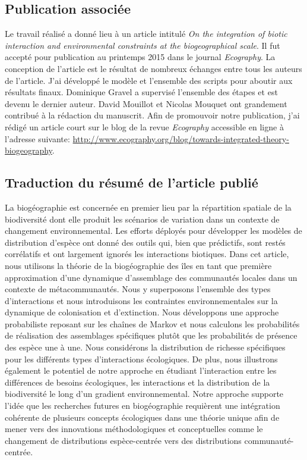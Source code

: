 \subsection{Publication associée}

Le travail réalisé a donné lieu à un article intitulé \emph{On the integration of biotic interaction and environmental constraints at the biogeographical scale}.
Il fut accepté pour publication au printemps 2015 dans le journal \emph{Ecography}.
La conception de l'article est le résultat de nombreux échanges entre tous les auteurs de l'article.
J'ai développé le modèle et l'ensemble des scripts pour aboutir aux résultats finaux.
Dominique Gravel a supervisé l'ensemble des étapes et est devenu le dernier auteur.
David Mouillot et Nicolas Mouquet ont grandement contribué à la rédaction du manuscrit.
Afin de promouvoir notre publication, j'ai rédigé un article court sur le blog de la revue \emph{Ecography} accessible en ligne à l'adresse suivante:
\url{http://www.ecography.org/blog/towards-integrated-theory-biogeography}.


\subsection{Traduction du résumé de l'article publié}

La biogéographie est concernée en premier lieu par la répartition spatiale de la biodiversité dont elle produit les scénarios de variation dans un contexte de changement environnemental.
Les efforts déployés pour développer les modèles de distribution d'espèce ont donné des outils qui, bien que prédictifs, sont restés corrélatifs et ont largement ignorés les interactions biotiques.
Dans cet article, nous utilisons la théorie de la biogéographie des îles en tant que première approximation d'une dynamique d'assemblage des communautés locales dans un contexte de métacommunautés.
Nous y superposons l'ensemble des types d'interactions et nous introduisons les contraintes environnementales sur la dynamique de colonisation et d'extinction.
Nous développons une approche probabiliste reposant sur les chaînes de Markov et nous calculons les probabilités de réalisation des assemblages spécifiques plutôt que les probabilités de présence des espèce une à une.
Nous considérons la distribution de richesse spécifiques pour les différents types d'interactions écologiques.
De plus, nous illustrons également le potentiel de notre approche en étudiant l'interaction entre les différences de besoins écologiques, les interactions et la distribution de la biodiversité le long d'un gradient environnemental.
Notre approche supporte l'idée que les recherches futures en biogéographie requièrent une intégration cohérente de plusieurs concepts écologiques dans une théorie unique afin de mener vers des innovations méthodologiques et conceptuelles comme le changement de distributions espèce-centrée vers des distributions communauté-centrée.

